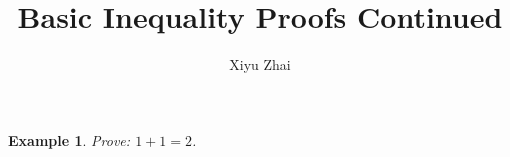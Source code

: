 \documentclass{article}
\newtheorem{example}{Example}
\begin{document}
\title{Basic Inequality Proofs Continued}
\author{Xiyu Zhai}
\maketitle

\begin{example}
    Prove: $1+1=2$.
\end{example}
\end{document}
